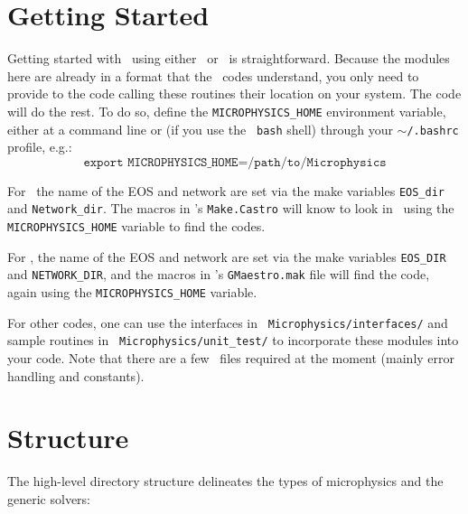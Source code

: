 \section{Getting Started}

Getting started with \microphysics\ using either \castro\ or
\maestro\ is straightforward. Because the modules here are already in
a format that the \amrex\ codes understand, you only need to provide
to the code calling these routines their location on your system. The
code will do the rest. To do so, define the {\tt MICROPHYSICS\_HOME}
environment variable, either at a command line or (if you use the {\tt
  bash} shell) through your {\tt $\sim$/.bashrc} profile, e.g.:
\begin{equation*}
  \texttt{export MICROPHYSICS\_HOME=/path/to/Microphysics}
\end{equation*}

For \castro\, the name of the EOS and network are set via the make
variables {\tt EOS\_dir} and {\tt Network\_dir}.  The macros in
\castro's {\tt Make.Castro} will know to look in \microphysics\ using
the {\tt MICROPHYSICS\_HOME} variable to find the codes.

For \maestro, the name of the EOS and network are set via the make
variables {\tt EOS\_DIR} and {\tt NETWORK\_DIR}, and the macros in
\maestro's {\tt GMaestro.mak} file will find the code, again using the
           {\tt MICROPHYSICS\_HOME} variable.

For other codes, one can use the interfaces in {\tt
  Microphysics/interfaces/} and sample routines in {\tt
  Microphysics/unit\_test/} to incorporate these modules into your
code.  Note that there are a few \amrex\ files required at the moment
(mainly error handling and constants).

\section{Structure}

The high-level directory structure delineates the types of microphysics
and the generic solvers:

